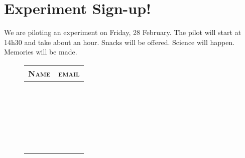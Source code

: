 \documentclass[11pt]{article}
\begin{document}
\thispagestyle{empty}

\section*{Experiment Sign-up!}

We are piloting an experiment on Friday, 28 February.  The pilot will start at 14h30 and take about an hour. Snacks will be offered. Science will happen. Memories will be made. 

\begin{figure}[H]
\centering
\setlength{\tabcolsep}{110pt}
\begin{tabular}{|l|l|}
\hline
{\bf \scshape Name}& {\bf \scshape email}\\
\hline\hline
 & \\[2ex]\hline
 & \\[2ex]\hline
 & \\[2ex]\hline
 & \\[2ex]\hline
 & \\[2ex]\hline
 & \\[2ex]\hline
 & \\[2ex]\hline
 & \\[2ex]\hline
 & \\[2ex]\hline
 & \\[2ex]\hline
 & \\[2ex]\hline
 & \\[2ex]\hline 
 & \\[2ex]\hline
 & \\[2ex]\hline
 & \\[2ex]\hline 
 & \\[2ex]\hline
 & \\[2ex]\hline
 & \\[2ex]\hline
  & \\[2ex]\hline
 & \\[2ex]\hline
 & \\[2ex]\hline
  & \\[2ex]\hline
 & \\[2ex]\hline
 & \\[2ex]\hline
\end{tabular}
\end{figure}

\newpage
\thispagestyle{empty}
\end{document}
